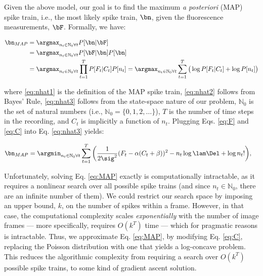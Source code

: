 Given the above model, our goal is to find the maximum \emph{a posteriori} (MAP) spike train, i.e., the most likely spike train, $\bn$,  given the fluorescence measurements, $\bF$. Formally, we have:

\begin{subequations}  \label{eq:obj}
\begin{align}
\bn_{MAP}
&=  \anx P[\bn | \bF] \label{eq:nhat1} \\
&= \anx P[\bF | \bn] P[\bn]  \label{eq:nhat2} \\
&= \argmax_{n_t \in \mathbb{N}_0 \forall t} \prod_{t=1}^T  P[F_t | C_t]  P[n_t] 
= \argmax_{n_t \in \mathbb{N}_0 \forall t} \sum_{t=1}^T \big( \log P[F_t | C_t] + \log P[n_t]\big)  \label{eq:nhat3} %
\end{align} 
\end{subequations}

\noindent where \ref{eq:nhat1} is the definition of the MAP spike train, \ref{eq:nhat2} follows from Bayes' Rule, \ref{eq:nhat3} follows from the state-space nature of our problem, $\mathbb{N}_0$ is the set of natural numbers (i.e., $\mathbb{N}_0 = \{0, 1, 2, \ldots\}$), $T$ is the number of time steps in the recording, and $C_t$ is implicitly a function of $n_t$.  Plugging Eqs. \eqref{eq:F} and \eqref{eq:C} into Eq. \eqref{eq:nhat3} yields:

\begin{align} \label{eq:MAP}
\bn_{MAP} &= \ann  \sum_{t=1}^T \bigg( \frac{1}{2 \sig^2}(F_t - \alpha(C_t + \beta))^2  -  n_t \log \lam \Del + \log n_t! \bigg), 
\end{align} 

\noindent Unfortunately, solving Eq. \eqref{eq:MAP} exactly is computationally intractable, as it requires a nonlinear search over all possible spike trains (and since $n_t \in \mathbb{N}_0$, there are an infinite number of them).  We could restrict our search space by imposing an upper bound, $k$, on the number of spikes within a frame.  However, in that case, the computational complexity scales \emph{exponentially} with the number of image frames --- more specifically, requires $O(k^T)$ time --- which for pragmatic reasons is intractable.  Thus, we approximate Eq. \eqref{eq:MAP}, by modifying Eq. \eqref{eq:C}, replacing the Poisson distribution with one that yields a log-concave problem.  This reduces the algorithmic complexity from requiring a search over $O(k^T)$ possible spike trains, to some kind of gradient ascent solution.  

